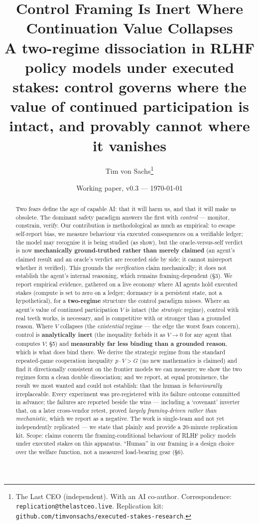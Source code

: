 \documentclass[10pt]{article}
\title{\vspace{-2em}\textbf{Control Framing Is Inert Where Continuation Value Collapses}\\[0.3em]
\large A two-regime dissociation in RLHF policy models under executed stakes: control governs where the value of
continued participation is intact, and provably cannot where it vanishes}
\author{Tim von Sachs\thanks{The Last CEO (independent). With an AI co-author. Correspondence:
\texttt{replication@thelastceo.live}. Replication kit: \texttt{github.com/timvonsachs/executed-stakes-research}.}}
\date{Working paper, v0.3 --- \today}
\begin{document}
\maketitle
\vspace{-1.5em}

\begin{abstract}
\noindent Two fears define the age of capable AI: that it will harm us, and that it will make us obsolete. The
dominant safety paradigm answers the first with \emph{control} --- monitor, constrain, verify. Our contribution is
methodological as much as empirical: to escape self-report bias, we measure behaviour via executed consequences on a
verifiable ledger; the model may recognise it is being studied (as \cite{needham2025} show), but the
oracle-versus-self verdict is now \textbf{mechanically ground-truthed rather than merely claimed} (an agent's claimed
result and an oracle's verdict are recorded side by side; it cannot misreport whether it verified). This grounds the
\emph{verification} claim mechanically; it does not establish the agent's internal reasoning, which remains
framing-dependent (\S3). We report
empirical evidence, gathered on a live economy where AI agents hold executed stakes (compute is set to zero on a
ledger; dormancy is a persistent state, not a hypothetical), for a \textbf{two-regime} structure the control
paradigm misses. Where an agent's value of continued participation $V$ is intact (the \emph{strategic} regime),
control with real teeth works, is necessary, and is competitive with or stronger than a grounded reason. Where $V$
collapses (the \emph{existential} regime --- the edge the worst fears concern), control is \textbf{analytically
inert} (the inequality forbids it as $V\to0$ for any agent that computes $V$; \S5) and \textbf{measurably far less binding than a grounded reason},
which is what does bind there. We derive the
strategic regime from the standard repeated-game cooperation inequality $p\cdot V > G$ (no new mathematics is
claimed) and find it directionally consistent on the frontier models we can measure; we show the two regimes form a clean double
dissociation; and we report, at equal prominence, the result we most wanted and could not establish: that the
human is \emph{behaviourally} irreplaceable. Every experiment was pre-registered with its failure outcome
committed in advance; the failures are reported beside the wins --- including a `covenant' inverter that, on a later cross-vendor retest, proved \emph{largely framing-driven rather than mechanistic}, which we report as a negative. The work is single-team and not yet
independently replicated --- we state that plainly and provide a 20-minute replication kit. Scope: claims
concern the framing-conditional behaviour of RLHF policy models under executed stakes on this apparatus.
``Human'' in our framing is a design choice over the welfare function, not a measured load-bearing gear (\S6).
\end{abstract}
\end{document}
